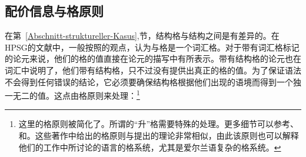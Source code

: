 \subsection{配价信息与格原则}

在第~\ref{Abschnitt-struktureller-Kasus},节，结构格与结构之间是有差异的。在HPSG的文献中，一般按照\citet{Haider86}的观点，认为与格是一个词汇格。对于带有词汇格标记的论元来说，他们的格的值直接在论元的描写中有所表示。带有结构格的论元也在词汇中说明了，他们带有结构格，只不过没有提供出真正的格的值。为了保证语法不会得到任何错误的结论，它必须要确保结构格根据他们出现的语境而得到一个独一无二的值。这点由格原则来处理：\footnote{%
这里的格原则被简化了。所谓的“升”格需要特殊的处理。更多细节可以参考、和。这些著作中给出的格原则与\citet*{YMJ87}提出的理论非常相似，由此该原则也可以解释他们的工作中所讨论的语言的格系统，尤其是爱尔兰语复杂的格系统。
}
